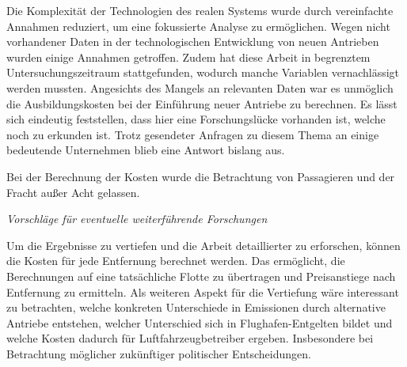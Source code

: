 Die Komplexität der Technologien des realen Systems wurde durch vereinfachte Annahmen reduziert, 
um eine fokussierte Analyse zu ermöglichen. 
Wegen nicht vorhandener Daten in der technologischen Entwicklung von neuen Antrieben wurden einige Annahmen getroffen.
Zudem hat diese Arbeit in begrenztem Untersuchungszeitraum stattgefunden, 
wodurch manche Variablen vernachlässigt werden mussten.
%
Angesichts des Mangels an relevanten Daten war es unmöglich die Ausbildungskosten bei der Einführung neuer Antriebe zu berechnen.
Es lässt sich eindeutig feststellen, dass hier eine Forschungslücke vorhanden ist, welche noch zu erkunden ist.
Trotz gesendeter Anfragen zu diesem Thema an einige bedeutende Unternehmen blieb eine Antwort bislang aus.

Bei der Berechnung der Kosten wurde die Betrachtung von Passagieren und der Fracht außer Acht gelassen. 

\textit{Vorschläge für eventuelle weiterführende Forschungen}

Um die Ergebnisse zu vertiefen und die Arbeit detaillierter zu erforschen, können die Kosten für jede Entfernung berechnet werden.
Das ermöglicht, die Berechnungen auf eine tatsächliche Flotte zu übertragen und Preisanstiege nach Entfernung zu ermitteln.
Als weiteren Aspekt für die Vertiefung wäre interessant zu betrachten, welche konkreten Unterschiede in Emissionen durch 
alternative Antriebe entstehen, welcher Unterschied sich in Flughafen-Entgelten bildet und welche Kosten dadurch
für Luftfahrzeugbetreiber ergeben. Insbesondere bei Betrachtung möglicher zukünftiger politischer Entscheidungen.


